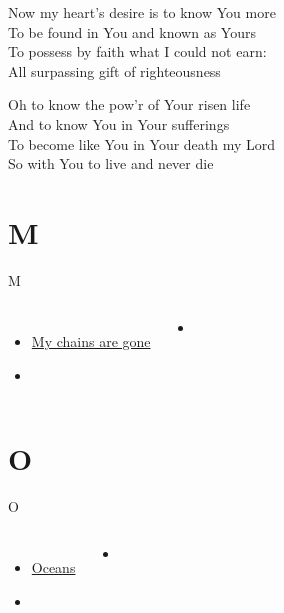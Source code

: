 \documentclass[aspectratio=169]{beamer}
\begin{document}
{\begin{frame}{}
\end{frame}
\hypertarget{Knowing You['All I once held dear']2}{}
\begin{frame}{}
\fontsize{20.930232558139537}{25.116279069767444}\selectfont

Now my heart's desire is to know You more\\ 
To be found in You and known as Yours\\ 
To possess by faith what I could not earn:\\ 
All surpassing gift of righteousness

\end{frame}
\hypertarget{Knowing You['All I once held dear']3}{}
\begin{frame}{}
\fontsize{20.930232558139537}{25.116279069767444}\selectfont

Oh to know the pow'r of Your risen life\\ 
And to know You in Your sufferings\\ 
To become like You in Your death my Lord\\ 
So with You to live and never die

\end{frame}
}

\section{ M }

\begin{frame}[t]{M}
\begin{columns}[t]
\begin{itemize}
    \item \hyperlink{Amazing grace['My chains are gone'](Tomlin)}{My chains are gone}
    \item[] \phantom{1}
\end{itemize}
\begin{itemize}
    \item[] \phantom{1}
\end{itemize}
\end{columns}
\end{frame}

\section{ O }

\begin{frame}[t]{O}
\begin{columns}[t]
\begin{itemize}
    \item \hyperlink{Oceans[](Hillsong)}{Oceans}
    \item[] \phantom{1}
\end{itemize}
\begin{itemize}
    \item[] \phantom{1}
\end{itemize}
\end{columns}
\end{frame}
\end{document}
